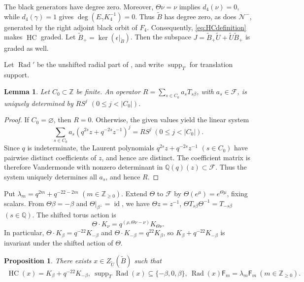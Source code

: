 \documentclass[12pt,reqno]{amsart}
\theoremstyle{plain}
\newtheorem{lemma}[theorem]{Lemma}
\newtheorem{proposition}[theorem]{Proposition}
\theoremstyle{definition}
\numberwithin{equation}{section}
\newcommand{\kk}{\mathbb Q(q)}
\newcommand{\Rad}{\operatorname{Rad}}
\newcommand{\HC}{\operatorname{HC}}
\newcommand{\eps}{\epsilon}
\newcommand{\id}{\operatorname{id}}
\begin{document}
The black generators have degree zero. Moreover,
$\Theta\nu=\nu$ implies $d_4(\nu)=0$, while $d_4(\gamma)=1$
gives $\deg(E_\gamma K_4^{-1})=0$.
Thus $\widetilde B$ has degree zero, as does $\mathcal N^-$,
generated by the right adjoint black orbit of $F_4$.
Consequently, \eqref{eq:HCdefinition} makes $\HC$ graded.
Let $\widetilde B_+=\ker(\eps|_{\widetilde B})$.
Then the subspace
$J=\widetilde B_+\widetilde U+\widetilde U\widetilde B_+$
is graded as well.

Let $\Rad'$ be the unshifted radial part of
\cite[Lemma~3.1 and Definition~3.2]{Sch26}, and write
$\operatorname{supp}_T$ for translation support.

\begin{lemma}\label{lem:reconstruct}
	Let $C_0\subset\mathbb Z$ be finite.
	An operator
	$R=\sum_{s\in C_0}a_sT_{s\beta}$, with $a_s\in\mathcal F$,
	is uniquely determined by $RS^j$ $(0\leq j<|C_0|)$.
\end{lemma}

\begin{proof}
	If $C_0=\varnothing$, then $R=0$.
	Otherwise, the given values yield the linear system
	\[
	\sum_{s\in C_0}a_s(q^{2s}z+q^{-2s}z^{-1})^j
	=RS^j
	\ (0\leq j<|C_0|).
	\]
	Since $q$ is indeterminate, the Laurent polynomials
	$q^{2s}z+q^{-2s}z^{-1}$ $(s\in C_0)$ have pairwise distinct
	coefficients of $z$, and hence are distinct.
	The coefficient matrix is therefore Vandermonde with nonzero
	determinant in $\kk(z)\subset\mathcal F$.
	Thus the system uniquely determines all $a_s$, and hence $R$.
\end{proof}

Put $\lambda_m=q^{2m}+q^{-22-2m}$ $(m\in\mathbb Z_{\geq0})$.
Extend $\Theta$ to $\mathcal F$ by
$\Theta(e^\mu)=e^{\Theta\mu}$, fixing scalars.
From $\Theta\beta=-\beta$ and $\Theta|_{\beta^\perp}=\id$, we have $\Theta z=z^{-1}$, $\Theta T_{s\beta}\Theta^{-1}=T_{-s\beta}$ $(s\in\mathbb Q)$.
The shifted torus action is
\[
\Theta\mathbin{\cdot}K_\nu
=q^{(\rho,\Theta\nu-\nu)}K_{\Theta\nu}.
\]
In particular,
$\Theta\mathbin{\cdot}K_\beta=q^{-22}K_{-\beta}$ and
$\Theta\mathbin{\cdot}K_{-\beta}=q^{22}K_\beta$,
so $K_\beta+q^{-22}K_{-\beta}$ is invariant under the shifted
action of $\Theta$.

\begin{proposition}\label{prop:radialinput}
	There exists $x\in Z_{\widetilde U}(\widetilde B)$ such that
	\begin{gather*}
		\HC(x)=K_\beta+q^{-22}K_{-\beta},\ 
		\operatorname{supp}_T\Rad(x)\subseteq\{-\beta,0,\beta\},\ 
		\Rad(x)\mathsf{F}_m=\lambda_m\mathsf{F}_m
		\ (m\in\mathbb Z_{\geq0}).
	\end{gather*}
\end{proposition}
\end{document}
